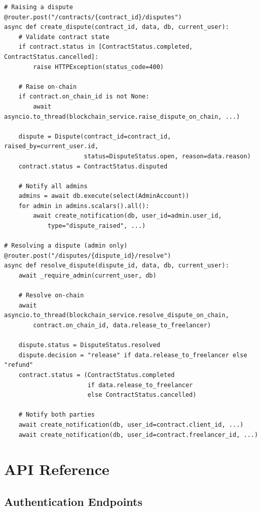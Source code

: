 \documentclass[12pt,a4paper]{article}
\begin{document}
\begin{lstlisting}[style=pythonstyle]
# Raising a dispute
@router.post("/contracts/{contract_id}/disputes")
async def create_dispute(contract_id, data, db, current_user):
    # Validate contract state
    if contract.status in [ContractStatus.completed, ContractStatus.cancelled]:
        raise HTTPException(status_code=400)

    # Raise on-chain
    if contract.on_chain_id is not None:
        await asyncio.to_thread(blockchain_service.raise_dispute_on_chain, ...)

    dispute = Dispute(contract_id=contract_id, raised_by=current_user.id,
                      status=DisputeStatus.open, reason=data.reason)
    contract.status = ContractStatus.disputed

    # Notify all admins
    admins = await db.execute(select(AdminAccount))
    for admin in admins.scalars().all():
        await create_notification(db, user_id=admin.user_id,
            type="dispute_raised", ...)

# Resolving a dispute (admin only)
@router.post("/disputes/{dispute_id}/resolve")
async def resolve_dispute(dispute_id, data, db, current_user):
    await _require_admin(current_user, db)

    # Resolve on-chain
    await asyncio.to_thread(blockchain_service.resolve_dispute_on_chain,
        contract.on_chain_id, data.release_to_freelancer)

    dispute.status = DisputeStatus.resolved
    dispute.decision = "release" if data.release_to_freelancer else "refund"
    contract.status = (ContractStatus.completed
                       if data.release_to_freelancer
                       else ContractStatus.cancelled)

    # Notify both parties
    await create_notification(db, user_id=contract.client_id, ...)
    await create_notification(db, user_id=contract.freelancer_id, ...)
\end{lstlisting}

\section{API Reference}

\subsection{Authentication Endpoints}
\end{document}
